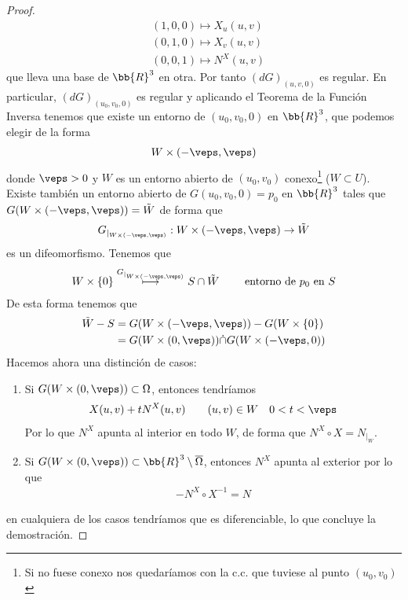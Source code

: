 \begin{teo}
\begin{proof}
\begin{align*}
            &(1,0,0) \mapsto X_u(u,v)\\
            &(0,1,0) \mapsto X_v(u,v)\\
            &(0,0,1) \mapsto N^X(u,v)
        \end{align*}
        que lleva una base de $\bb{R}^3$ en otra. Por tanto $(dG)_{(u,v,0)}$ es regular. En particular, $(dG)_{(u_0,v_0,0)}$ es regular y aplicando el Teorema de la Función Inversa tenemos que existe un entorno de $(u_0, v_0, 0)$ en $\bb{R}^3$, que podemos elegir de la forma
        \begin{gather*}
            W \times (-\veps, \veps)
        \end{gather*}
        donde $\veps>0$ y $W$ es un entorno abierto de $(u_0, v_0)$ conexo\footnote{Si no fuese conexo nos quedaríamos con la c.c. que tuviese al punto $(u_0, v_0)$} ($W\subset U$). Existe también un entorno abierto de $G(u_0, v_0, 0)=p_0$ en $\bb{R}^3$ tales que $G(W\times(-\veps, \veps))=\tilde{W}$ de forma que 
        \begin{gather*}
            G_{|_{W\times(-\veps, \veps)}} : W\times (-\veps, \veps) \to \tilde{W}
        \end{gather*}
        es un difeomorfismo. Tenemos que 
        \begin{gather*}
            W\times\{0\} \overset{G_{|_{W\times(-\veps, \veps)}}}{\longmapsto} S\cap \tilde{W} \qquad \text{ entorno de $p_0$ en $S$}
        \end{gather*}
        De esta forma tenemos que 
        \begin{align*}
            \tilde{W}-S &= G(W\times(-\veps, \veps)) - G(W\times\{0\})\\
            &=
            G(W\times(0,\veps)) \dot{\cap} G(W\times(-\veps,0))
        \end{align*}
        Hacemos ahora una distinción de casos:
        \begin{enumerate}
            \item[i)] Si $G(W\times (0,\veps))\subset \Omega$, entonces tendríamos
            \begin{gather*}
                X(u,v) + tN^X(u,v) \qquad (u,v)\in W \quad 0<t<\veps
            \end{gather*}
            Por lo que $N^X$ apunta al interior en todo $W$, de forma que $N^X\circ X = N_{|_W}$.
            
            \item[ii)] Si $G(W\times (0,\veps))\subset \bb{R}^3 \setminus \overline{\Omega}$, entonces $N^X$ apunta al exterior por lo que 
            \begin{gather*}
                -N^X \circ X^{-1} = N
            \end{gather*}
        \end{enumerate}
        en cualquiera de los casos tendríamos que es diferenciable, lo que concluye la demostración.
    \end{proof}
\end{teo}

